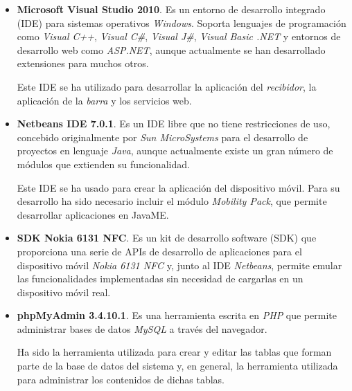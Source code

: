   \begin{itemize}
    \item \textbf{Microsoft Visual Studio 2010}.
    Es un entorno de desarrollo integrado (\acs{IDE}) para sistemas operativos
    \emph{Windows}. Soporta lenguajes de programación como \emph{Visual C++},
    \emph{Visual C\#}, \emph{Visual J\#}, \emph{Visual Basic .NET} y
    entornos de desarrollo web como \emph{ASP.NET}, aunque actualmente
    se han desarrollado extensiones para muchos otros.

    Este \acs{IDE} se ha utilizado para desarrollar la aplicación del
    \emph{recibidor}, la aplicación de la \emph{barra} y los servicios web.
    
    \item \textbf{Netbeans IDE 7.0.1}.
    Es un \acs{IDE} libre que no tiene restricciones de uso, concebido 
    originalmente por \emph{Sun MicroSystems} para el desarrollo de proyectos
    en lenguaje \emph{Java}, aunque actualmente existe un gran número de 
    módulos que extienden su funcionalidad.

    Este \acs{IDE} se ha usado para crear la aplicación del dispositivo móvil.
    Para su desarrollo ha sido necesario incluir el módulo \emph{Mobility 
    Pack}, que permite desarrollar aplicaciones en \acs{JavaME}.

    \item \textbf{SDK Nokia 6131 NFC}. 
    Es un kit de desarrollo software (\acs{SDK}) que proporciona una serie
    de \acs{API}s de desarrollo de aplicaciones para el dispositivo móvil
    \emph{Nokia 6131 \acs{NFC}} y, junto al \acs{IDE} \emph{Netbeans},
    permite emular las funcionalidades implementadas sin necesidad de
    cargarlas en un dispositivo móvil real.
    
    \item \textbf{phpMyAdmin 3.4.10.1}.
    Es una herramienta escrita en \emph{PHP} que permite administrar bases
    de datos \emph{MySQL} a través del navegador.

    Ha sido la herramienta utilizada para crear y editar las tablas que
    forman parte de la base de datos del sistema y, en general, la herramienta
    utilizada para administrar los contenidos de dichas tablas.

  \end{itemize}

